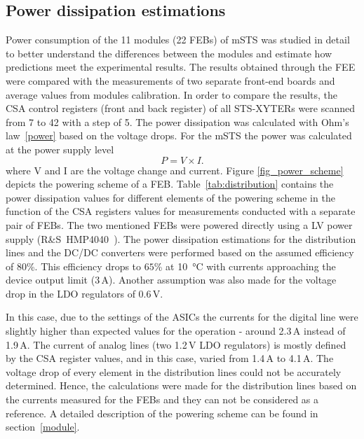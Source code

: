 \subsection{Power dissipation estimations}
 Power consumption of the 11 modules (22 \glspl{FEB}) of \gls{mSTS} was studied in detail to better understand the differences between the modules and estimate how predictions meet the experimental results. The results obtained through the \gls{FEE} were compared with the measurements of two separate front-end boards and average values from modules calibration. In order to compare the results, the \gls{CSA} control registers (front and back register) of all STS-XYTERs were scanned from 7 to 42 with a step of 5. The power dissipation was calculated with Ohm's law~\ref{power} based on the voltage drops. For the \gls{mSTS} the power was calculated at the power supply level
  \begin{equation}
  \label{power}
    P = V\times I.
\end{equation}
where V and I are the voltage change and current. Figure \ref{fig_power_scheme} depicts the powering scheme of a \gls{FEB}. Table~\ref{tab:distribution} contains the power dissipation values for different elements of the powering scheme in the function of the \gls{CSA} registers values for measurements conducted with a separate pair of \glspl{FEB}. The two mentioned \glspl{FEB} were powered directly using a \gls{LV} power supply (R\&S~HMP4040~\cite{RS}). The power dissipation estimations for the distribution lines and the DC/DC converters were performed based on the assumed efficiency of $80$\%. This efficiency drops to $65$\% at \SI{10}{\celsius} with currents approaching the device output limit (3\,A).  Another assumption was also made for the voltage drop in the \gls{LDO} regulators of 0.6\,V. 
 
 In this case, due to the settings of the \glspl{ASIC} the currents for the digital line were slightly higher than expected values for the operation - around 2.3\,A instead of 1.9\,A. The current of analog lines (two 1.2\,V LDO regulators) is mostly defined by the \gls{CSA} register values, and in this case, varied from 1.4\,A to 4.1\,A.  The voltage drop of every element in the distribution lines could not be accurately determined. Hence, the calculations were made for the distribution lines based on the currents measured for the \glspl{FEB} and they can not be considered as a reference. A detailed description of the powering scheme can be found in section~\ref{module}.


